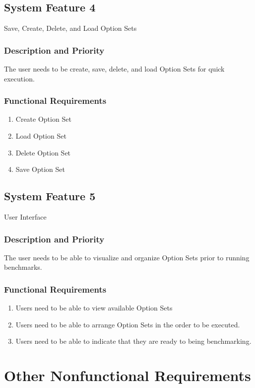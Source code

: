 \documentclass{scrreprt}
\begin{document}
	
\section{System Feature 4}
Save, Create, Delete, and Load Option Sets

\subsection{Description and Priority}
The user needs to be create, save, delete, and load Option Sets for quick execution.

\subsection{Functional Requirements}
\begin{enumerate}
	\item Create Option Set
	\item Load Option Set
	\item Delete Option Set
	\item Save Option Set
\end{enumerate}

\section{System Feature 5}
User Interface

\subsection{Description and Priority}
The user needs to be able to visualize and organize Option Sets prior to running benchmarks.

\subsection{Functional Requirements}
\begin{enumerate}
	\item Users need to be able to view available Option Sets
	\item Users need to be able to arrange Option Sets in the order to be executed.
	\item Users need to be able to indicate that they are ready to being benchmarking.
\end{enumerate}

\chapter{Other Nonfunctional Requirements}
\end{document}
